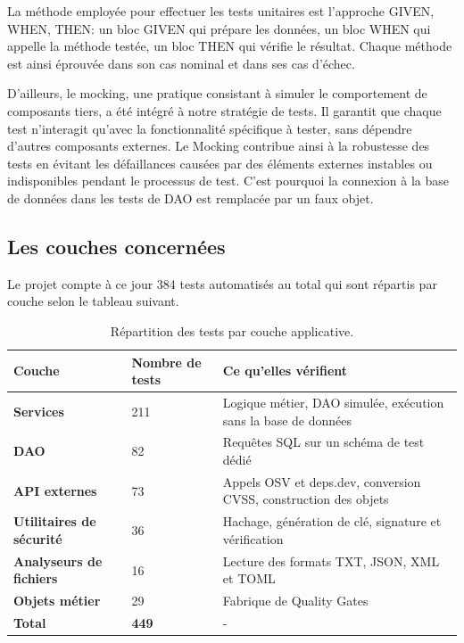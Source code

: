 \documentclass[a4paper,12pt]{article}
\begin{document}
La méthode employée pour effectuer les tests unitaires est l'approche
GIVEN, WHEN, THEN: un bloc GIVEN qui prépare les données, un bloc WHEN
qui appelle la méthode testée, un bloc THEN qui vérifie le résultat.
Chaque méthode est ainsi éprouvée dans son cas nominal et dans ses cas
d'échec.

D'ailleurs, le mocking, une pratique consistant à simuler le
comportement de composants tiers, a été intégré à notre stratégie de
tests. Il garantit que chaque test n'interagit qu'avec la fonctionnalité
spécifique à tester, sans dépendre d'autres composants externes. Le
Mocking contribue ainsi à la robustesse des tests en évitant les
défaillances causées par des éléments externes instables ou
indisponibles pendant le processus de test. C'est pourquoi la connexion
à la base de données dans les tests de DAO est remplacée par un faux
objet.

\subsection{Les couches concernées}\label{les-couches-concernuxe9es}

Le projet compte à ce jour 384 tests automatisés au total qui sont
répartis par couche selon le tableau suivant.

\begin{table}[H]
\centering
\renewcommand{\arraystretch}{1.3}
\begin{tabular}{|p{3.5cm}|p{2.5cm}|p{8cm}|}
\hline
\textbf{Couche} & \textbf{Nombre de tests} & \textbf{Ce qu'elles vérifient} \\
\hline
\textbf{Services} & 211 & Logique métier, DAO simulée, exécution sans la base de données \\
\hline
\textbf{DAO} & 82 & Requêtes SQL sur un schéma de test dédié \\
\hline
\textbf{API externes} & 73 & Appels OSV et deps.dev, conversion CVSS, construction des objets \\
\hline
\textbf{Utilitaires de sécurité} & 36 & Hachage, génération de clé, signature et vérification \\
\hline
\textbf{Analyseurs de fichiers} & 16 & Lecture des formats TXT, JSON, XML et TOML \\
\hline
\textbf{Objets métier} & 29 & Fabrique de Quality Gates \\
\hline
\textbf{Total} & \textbf{449} & - \\
\hline
\end{tabular}
\caption{Répartition des tests par couche applicative.}
\label{tab:repartition-tests}
\end{table}
\end{document}
